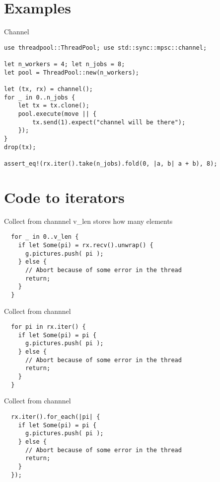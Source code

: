 \documentclass[aspectratio=1610,t]{beamer}
\begin{document}
{
\section{Examples}
}
\begin{frame}[fragile]{Channel}
\begin{verbatim}
use threadpool::ThreadPool; use std::sync::mpsc::channel;

let n_workers = 4; let n_jobs = 8;
let pool = ThreadPool::new(n_workers);

let (tx, rx) = channel();
for _ in 0..n_jobs {
    let tx = tx.clone();
    pool.execute(move || {
        tx.send(1).expect("channel will be there");
    });
}
drop(tx);

assert_eq!(rx.iter().take(n_jobs).fold(0, |a, b| a + b), 8);
\end{verbatim}
\end{frame}



{
\section{Code to iterators}
}
\begin{frame}[fragile]{Collect from channnel}
v\_len stores how many elements
\begin{verbatim}
  for _ in 0..v_len {
    if let Some(pi) = rx.recv().unwrap() {
      g.pictures.push( pi );
    } else {
      // Abort because of some error in the thread
      return;
    }
  }
\end{verbatim}
\end{frame}

\begin{frame}[fragile]{Collect from channnel}
\begin{verbatim}
  for pi in rx.iter() {
    if let Some(pi) = pi {
      g.pictures.push( pi );
    } else {
      // Abort because of some error in the thread
      return;
    }
  }
\end{verbatim}
\end{frame}

\begin{frame}[fragile]{Collect from channnel}
\begin{verbatim}
  rx.iter().for_each(|pi| {
    if let Some(pi) = pi {
      g.pictures.push( pi );
    } else {
      // Abort because of some error in the thread
      return;
    }
  });
\end{verbatim}
\end{frame}
\end{document}
